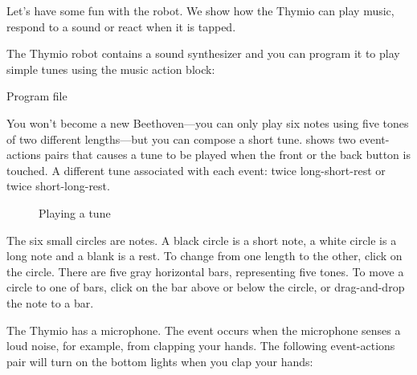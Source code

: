 \label{ch.bells}

Let's have some fun with the robot. We show how the Thymio can play
music, respond to a sound or react when it is tapped.


The Thymio robot contains a sound synthesizer and you can program it
to play simple tunes using the music action block: 

{\raggedleft \hfill Program file }

You won't become a new Beethoven---you can only play six notes using
five tones of two different lengths---but you can compose a short tune.
 shows two event-actions pairs that causes a tune to be
played when the front or the back button is touched. A different tune
associated with each event: twice long-short-rest or twice
short-long-rest.

\begin{figure}
\begin{center}
\caption{Playing a tune}\label{fig.music}
\end{center}
\end{figure}

The six small circles are notes. A black circle is a short note, a white
circle is a long note and a blank is a rest. To change from one length
to the other, click on the circle. There are five gray horizontal bars,
representing five tones. To move a circle to one of bars, click on the
bar above or below the circle, or drag-and-drop the note to a bar.




The Thymio has a microphone. The event  occurs
when the microphone senses a loud noise, for example, from clapping your
hands. The following event-actions pair will turn on the bottom lights
when you clap your hands:


\bigskip


